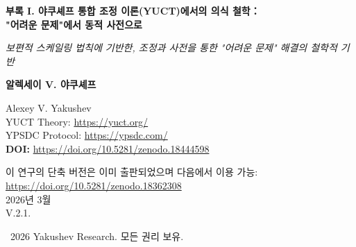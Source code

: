 \documentclass[12pt,a4paper]{article}
\begin{document}
	
	\begin{titlepage}
		\begin{center}
			\vspace*{0cm}
			
			\Huge\textbf{부록 I. 야쿠셰프 통합 조정 이론(YUCT)에서의 의식 철학：\\ "어려운 문제"에서 동적 사전으로}
			
			\vspace{1cm}
			
			\small\textit{보편적 스케일링 법칙에 기반한, 조정과 사전을 통한 "어려운 문제" 해결의 철학적 기반}
			
			\vspace{0.5cm}
			
			\small\textbf{알렉세이 V. 야쿠셰프}
			
			\vspace{0.5cm}
			\Large
			Alexey V. Yakushev\\
			
			YUCT Theory: \url{https://yuct.org/}\\
			YPSDC Protocol: \url{https://ypsdc.com/}\\
			
			\vspace{1cm}
			\textbf{DOI:} \url{https://doi.org/10.5281/zenodo.18444598}\\
			
			\vspace{0.5cm}
			
			\vspace{0cm}
			\large 
			이 연구의 단축 버전은 이미 출판되었으며 다음에서 이용 가능: \\ \url{https://doi.org/10.5281/zenodo.18362308}\\
			\vspace{1cm}
			2026년 3월 \\ \large V.2.1.
			
			\vspace{4cm}
			\textcopyright~2026 Yakushev Research. 모든 권리 보유.
			
			\newpage
			
			\begin{abstract}
				\noindent
				본 논문은 통합 조정 이론(YUCT)의 틀 내에서 "의식의 어려운 문제"를 해결하기 위한 철학적 기반을 제공한다. 의식은 부수현상이나 환영이 아니라, \textbf{내적 사전의 계층}을 통해 구현되는 \textbf{동적 조정 과정}으로 이해된다. 고전적인 "뇌-의식" 이원론이 \textbf{유전적}, \textbf{신경적}, \textbf{문화적 사전}이라는 삼층 모델을 통해 극복됨을 보인다. 주관적 경험은 공유된 의미 공간을 사용한 신경 앙상블 간의 \textbf{실시간 조정}의 결과로 해석된다. 메타 사전(자신의 상태를 성찰하는 능력)은 자기성의 현상을 설명한다.
				

\end{abstract}
\end{center}
\end{titlepage}
\end{document}
